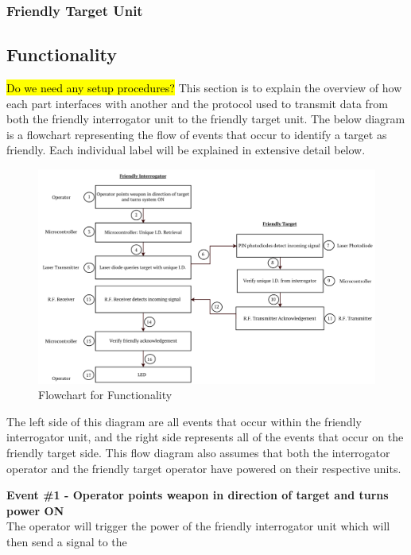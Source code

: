 \documentclass[letterpaper,10pt]{article}
\begin{document}
\begin{spacing}{1.15}
\subsubsection{Friendly Target Unit}

\subsection{Functionality} \label{section-functionality}
\hl{Do we need any setup procedures?}
This section is to explain the overview of how each part interfaces with another and the protocol used to transmit data from both the friendly interrogator unit to the friendly target unit. The below diagram is a flowchart representing the flow of events that occur to identify a target as friendly. Each individual label will be explained in extensive detail below.

\begin{figure} [H]
	\centering
	\includegraphics[scale=0.4]{Functional_Flowchart.png}
	\caption{Flowchart for Functionality\label{fig:circuit-schematic}}
\end{figure}

The left side of this diagram are all events that occur within the friendly interrogator unit, and the right side represents all of the events that occur on the friendly target side. This flow diagram also assumes that both the interrogator operator and the friendly target operator have powered on their respective units.

\normalsize\textbf{Event \#1 - Operator points weapon in direction of target and turns power ON}\\
The operator will trigger the power of the friendly interrogator unit which will then send a signal to the 


\end{spacing}
\end{document}
